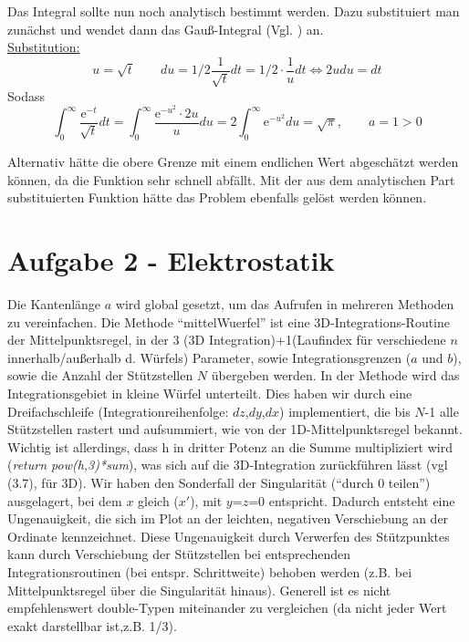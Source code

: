 Das Integral sollte nun noch analytisch bestimmt werden. Dazu substituiert man zunächst und wendet
dann das Gauß-Integral (Vgl. \cite{wiki}) an.\\
\underline{Substitution:}
\begin{equation*}
u = \sqrt{t} \qquad du = 1/2 \frac{1}{\sqrt{t}} dt = 1/2 \cdot \frac{1}{u} dt \Leftrightarrow 2udu = dt
\end{equation*}
Sodass
\begin{equation*}
\int_0^{\infty} \frac{\mathup{e}^{-t}}{\sqrt{t}} dt = \int_0^{\infty} \frac{\mathup{e}^{-u^2}\cdot 2u}{u} du = 2 \int_0^{\infty} \mathup{e}^{-u^2} du = \sqrt{\pi}, \qquad a=1>0
\end{equation*}

Alternativ hätte die obere Grenze mit einem endlichen Wert abgeschätzt werden können, da die Funktion sehr schnell abfällt. Mit der aus dem analytischen Part substituierten Funktion hätte das Problem ebenfalls gelöst werden können.


\section*{Aufgabe 2 - Elektrostatik}
Die Kantenlänge $a$ wird global gesetzt, um das Aufrufen in mehreren Methoden zu vereinfachen. Die
Methode \enquote{mittelWuerfel} ist eine 3D-Integrations-Routine der Mittelpunktsregel, in der 3 (3D
Integration)+1(Laufindex für verschiedene $n$ innerhalb/außerhalb d. Würfels) Parameter, sowie
Integrationsgrenzen ($a$ und $b$), sowie die Anzahl der Stützstellen $N$ übergeben werden. In der
Methode wird das Integrationsgebiet in kleine Würfel unterteilt. Dies haben wir durch eine
Dreifachschleife (Integrationreihenfolge: $dz$,$dy$,$dx$) implementiert, die bis $N$-1 alle
Stützstellen rastert und aufsummiert, wie von der 1D-Mittelpunktsregel bekannt. Wichtig ist
allerdings, dass h in dritter Potenz an die Summe multipliziert wird (\textit{return pow(h,3)*sum}),
was sich auf die 3D-Integration zurückführen lässt (vgl (3.7)\cite[32]{script}, für 3D).  Wir haben
den Sonderfall der Singularität (\enquote{durch 0 teilen}) ausgelagert, bei dem $x$ gleich ($x'$),
mit $y$=$z$=0 entspricht. Dadurch entsteht eine Ungenauigkeit, die sich im Plot an der leichten,
negativen Verschiebung an der Ordinate kennzeichnet. Diese Ungenauigkeit durch Verwerfen des Stützpunktes kann durch Verschiebung der Stützstellen bei entsprechenden Integrationsroutinen (bei entspr. Schrittweite) behoben werden (z.B. bei Mittelpunktsregel über die Singularität hinaus). Generell ist es nicht empfehlenswert double-Typen miteinander zu vergleichen (da nicht jeder Wert exakt darstellbar ist,z.B. 1/3).

